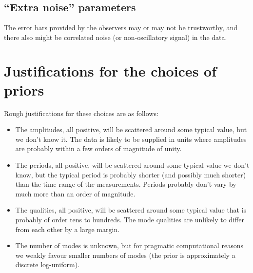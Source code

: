 \documentclass[a4paper, 12pt]{article}
\begin{document}
\subsection{``Extra noise'' parameters}

The error bars provided by the observers may or may not be trustworthy, and
there also might be correlated noise (or non-oscillatory signal) in the data.

\section{Justifications for the choices of priors}

Rough justifications for these choices are as follows:
\begin{itemize}
    \item The amplitudes, all positive, will be scattered around some typical
          value, but we don't know it. The data is likely to be supplied
          in units where amplitudes are probably
          within a few orders of magnitude of unity.
    \item The periods, all positive, will be scattered around some typical
          value we don't know, but the typical period is probably shorter
          (and possibly much shorter) than the time-range of the measurements.
          Periods probably don't vary by much more than an order of magnitude.
    \item The qualities, all positive, will be scattered around some typical
          value that is probably of order tens to hundreds. The mode qualities
          are unlikely to differ from each other by a large margin.
    \item The number of modes is unknown, but for pragmatic computational
          reasons we weakly favour smaller numbers of modes (the prior
          is approximately a discrete log-uniform).
\end{itemize}

\end{document}
